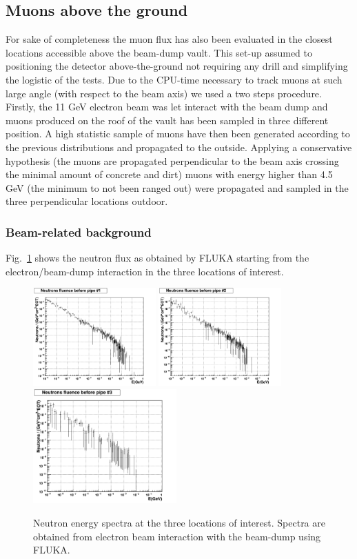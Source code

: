 \subsection{Muons above the ground}
For sake of completeness the muon flux has also been evaluated in the closest locations accessible above the  beam-dump vault.  This set-up assumed to positioning the detector above-the-ground not requiring any drill and simplifying the logistic of the tests.
 Due to the CPU-time necessary to track muons at such large angle (with respect to the beam axis) we used a two steps procedure. Firstly, the 11 GeV electron beam was let interact with the beam dump and muons produced on the roof of the vault has been sampled in three different position.
A high statistic sample of muons have then been generated according to the previous distributions and propagated to the outside.  Applying  a conservative hypothesis (the muons are propagated perpendicular to the beam axis  crossing the minimal amount of concrete and dirt) muons with energy higher than 4.5 GeV (the minimum to not been ranged out)  were propagated and sampled in the three perpendicular locations outdoor.


\subsubsection{Beam-related background}
Fig.~\ref{fig:nu-comp} shows the neutron flux  as obtained by  FLUKA starting from the electron/beam-dump interaction  in the  three locations of interest. 
\begin{figure}[h!] 
\center
\includegraphics[width=4.7cm]{figs/NeutronsPipe1_1D.pdf}
\includegraphics[width=4.7cm]{figs/NeutronsPipe2_1D.pdf}
\includegraphics[width=5.5cm]{figs/NeutronsPipe3_1D.pdf}
\caption {Neutron energy spectra at the three locations of interest. Spectra are obtained from electron beam interaction with the beam-dump using FLUKA.}
\label{fig:nu-comp}
\end{figure}


